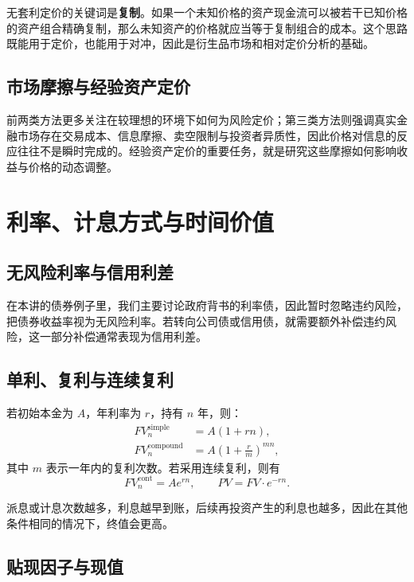 \documentclass[UTF8,11pt,a4paper]{ctexart}
\begin{document}
无套利定价的关键词是\textbf{复制}。如果一个未知价格的资产现金流可以被若干已知价格的资产组合精确复制，那么未知资产的价格就应当等于复制组合的成本。这个思路既能用于定价，也能用于对冲，因此是衍生品市场和相对定价分析的基础。

\subsection{市场摩擦与经验资产定价}

前两类方法更多关注在较理想的环境下如何为风险定价；第三类方法则强调真实金融市场存在交易成本、信息摩擦、卖空限制与投资者异质性，因此价格对信息的反应往往不是瞬时完成的。经验资产定价的重要任务，就是研究这些摩擦如何影响收益与价格的动态调整。

\section{利率、计息方式与时间价值}

\subsection{无风险利率与信用利差}

在本讲的债券例子里，我们主要讨论政府背书的利率债，因此暂时忽略违约风险，把债券收益率视为无风险利率。若转向公司债或信用债，就需要额外补偿违约风险，这一部分补偿通常表现为信用利差。

\subsection{单利、复利与连续复利}

若初始本金为 $A$，年利率为 $r$，持有 $n$ 年，则：
\begin{align}
  FV_n^{\text{simple}} &= A(1 + rn), \\
  FV_n^{\text{compound}} &= A\left(1 + \frac{r}{m}\right)^{mn},
\end{align}
其中 $m$ 表示一年内的复利次数。若采用连续复利，则有
\begin{equation}
  FV_n^{\text{cont}} = A e^{rn}, \qquad PV = FV \cdot e^{-rn}.
\end{equation}

派息或计息次数越多，利息越早到账，后续再投资产生的利息也越多，因此在其他条件相同的情况下，终值会更高。

\subsection{贴现因子与现值}
\end{document}
